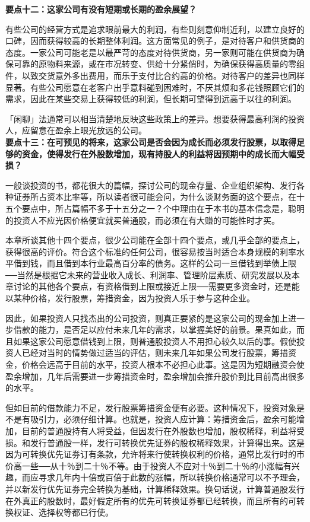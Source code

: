 \documentclass[UTF8,a4paper,zihao=-4,fontset = windows]{ctexart} %
\begin{document}
\textbf{要点十二：这家公司有没有短期或长期的盈余展望？}


有些公司的经营方式是追求眼前最大的利润，有些则刻意仰制近利，以建立良好的口碑，因而获得较高的长期整体利润。这方面常见的例子，是对待客户和供货商的态度。一家公司可能老是以最严苛的态度对待供货商，另一家则可能在供货商为确保可靠的原物料来源，或在市况转变、供给十分紧俏时，为确保获得高质量的零组件，以致交货意外多出费用，而乐于支付比合约高的价格。对待客户的差异也同样显著。有些公司愿意在老客户出乎意料碰到困难时，不厌其烦和多花钱照顾它们的需求，因此在某些交易上获得较低的利润，但长期可望得到远高于以往的利润。

「闲聊」法通常可以相当清楚地反映这些政策上的差异。想要获得最高利润的投资人，应留意在盈余上眼光放远的公司。
\\

\textbf{要点十三：在可预见的将来，这家公司是否会因为成长而必须发行股票，以取得足够的资金，使得发行在外股数增加，现有持股人的利益将因预期中的成长而大幅受损？}


一般谈投资的书，都花很大的篇幅，探讨公司的现金存量、企业组织架构、发行各种证券所占资本比率等，所以读者很可能会问，为什么谈财务面的这个要点，在十五个要点中，所占篇幅不多于十五分之一？个中理由在于本书的基本信念是，聪明的投资人不应光因价格便宜就买普通股，而必须在有大赚的可能性时才买。

本章所谈其他十四个要点，很少公司能在全部十四个要点，或几乎全部的要点上，获得很高的评价。符合这个标准的任何公司，很容易按当时适合本身规模的利率水平借到钱，而且借到本行业最高百分率的债务。这样的公司一旦借钱到举债上限──当然是根据它未来的营业收入成长、利润率、管理阶层素质、研究发展以及本章讨论的其他各个要点，有资格借到上限或接近上限──需要更多资金时，还是能以某种价格，发行股票，筹措资金，因为投资人乐于参与这种企业。

因此，如果投资人只找杰出的公司投资，则真正要紧的是这家公司的现金加上进一步借款的能力，是否足以应付未来几年的需求，以掌握美好的前景。果真如此，而且如果这家公司愿意借钱到上限，则普通股投资人不用担心较久以后的事。假使投资人已经对当时的情势做过适当的评估，则未来几年如果公司发行股票，筹措资金，价格会远高于目前的水平，投资人根本不必担心此事。这是因为短期融资会使盈余增加，几年后需要进一步筹措资金时，盈余增加会推升股价到比目前高出很多的水平。

但如目前的借款能力不足，发行股票筹措资金便有必要。这种情况下，投资对象是不是有吸引力，必须仔细计算。也就是，投资人应计算：筹措资金后，盈余可能增加，目前的普通股持有人将受益，但因发行在外股数也增加，股权稀释，利益将受损。和发行普通股一样，发行可转换优先证券的股权稀释效果，计算得出来。这是因为可转换优先证券订有条款，允许将来行使转换权利的价格，通常比发行时的市价高一些──从十％到二十％不等。由于投资人不应对十％到二十％的小涨幅有兴趣，而应寻求几年内十倍或百倍于此数的涨幅，所以转换价格通常可以不予理会，并以新发行优先证券完全转换为基础，计算稀释效果。换句话说，计算普通股发行在外真正的股数时，最好假定所有的优先可转换证券都已经转换，而且所有的可转换权证、选择权等都已行使。
\end{document}

